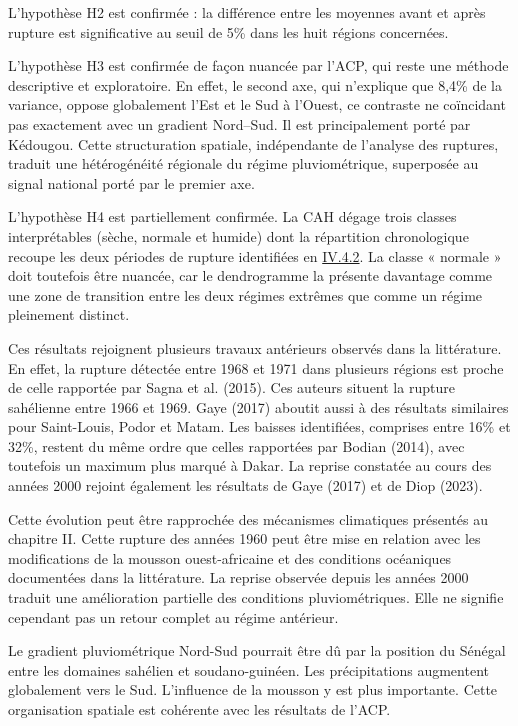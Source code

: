 \documentclass[12pt,a4paper]{report}
\begin{document}
L'hypothèse H2 est confirmée : la différence entre les moyennes avant et après rupture est significative au seuil de 5\% dans les huit régions concernées.

L’hypothèse H3 est confirmée de façon nuancée par l’ACP, qui reste une méthode descriptive et exploratoire. En effet, le second axe, qui n’explique que 8,4\% de la variance, oppose globalement l’Est et le Sud à l’Ouest, ce contraste ne coïncidant pas exactement avec un gradient Nord–Sud. Il est principalement porté par Kédougou. Cette structuration spatiale, indépendante de l’analyse des ruptures, traduit une hétérogénéité régionale du régime pluviométrique, superposée au signal national porté par le premier axe.

L’hypothèse H4 est partiellement confirmée. La CAH dégage trois classes interprétables (sèche, normale et humide) dont la répartition chronologique recoupe les deux périodes de rupture identifiées en \hyperref[sec:illustration-regionale]{IV.4.2}. La classe « normale » doit toutefois être nuancée, car le dendrogramme la présente davantage comme une zone de transition entre les deux régimes extrêmes que comme un régime pleinement distinct.

Ces résultats rejoignent plusieurs travaux antérieurs observés dans la littérature. En effet, la rupture détectée entre 1968 et 1971 dans plusieurs régions est proche de celle rapportée par Sagna et al. (2015). Ces auteurs situent la rupture sahélienne entre 1966 et 1969. Gaye (2017) aboutit aussi à des résultats similaires pour Saint-Louis, Podor et Matam. Les baisses identifiées, comprises entre 16\% et 32\%, restent du même ordre que celles rapportées par Bodian (2014), avec toutefois un maximum plus marqué à Dakar. La reprise constatée au cours des années 2000 rejoint également les résultats de Gaye (2017) et de Diop (2023).

Cette évolution peut être rapprochée des mécanismes climatiques présentés au chapitre II. Cette rupture des années 1960 peut être mise en relation avec les modifications de la mousson ouest-africaine et des conditions océaniques documentées dans la littérature. La reprise observée depuis les années 2000 traduit une amélioration partielle des conditions pluviométriques. Elle ne signifie cependant pas un retour complet au régime antérieur.

Le gradient pluviométrique Nord-Sud pourrait être dû par la position du Sénégal entre les domaines sahélien et soudano-guinéen. Les précipitations augmentent globalement vers le Sud. L’influence de la mousson y est plus importante. Cette organisation spatiale est cohérente avec les résultats de l’ACP.
\end{document}
